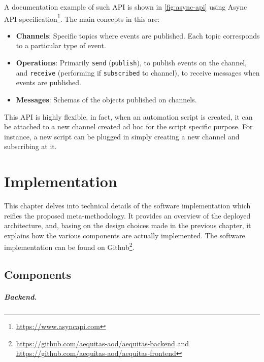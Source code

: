 \documentclass[12pt,a4paper,openright,twoside]{book}
\begin{document}
A documentation example of such \ac{API} is shown in \cref{fig:async-api} using Async \ac{API} specification\footnote{\url{https://www.asyncapi.com}}. The main concepts in this are:

\begin{itemize}
    \item \textbf{Channels}: Specific topics where events are published. Each topic corresponds to a particular type of event.
    \item \textbf{Operations}: Primarily \texttt{send} (\texttt{publish}), to publish events on the channel, and \texttt{receive} (performing if \texttt{subscribed} to channel), to receive messages when events are published.
    \item \textbf{Messages}: Schemas of the objects published on channels.
\end{itemize}


This API is highly flexible, in fact, when an automation script is created, it can be attached to a new channel created ad hoc for the script specific purpose.
%
For instance, a new script can be plugged in simply  creating a new channel and subscribing at it.




\chapter{Implementation}%
\label{chap:implementation}

This chapter delves into technical details of the software implementation which reifies the proposed meta-methodology.
%
It provides an overview of the deployed architecture, and, basing on the design choices made in the previous chapter, it explains how the various components are actually implemented.
%
The software implementation can be found on Github\footnote{\url{https://github.com/aequitas-aod/aequitas-backend} and \url{https://github.com/aequitas-aod/aequitas-frontend}}.


\section{Components}


\paragraph{Backend.}
\end{document}
